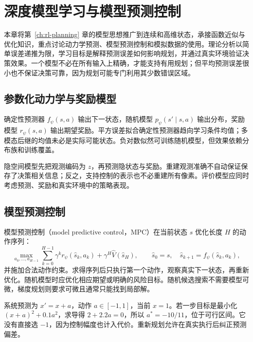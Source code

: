 \setcounter{chapter}{17} %
\chapter{深度模型学习与模型预测控制}
\label{ch:rl-deep-model}

本章将第~\ref{ch:rl-planning} 章的模型思想推广到连续和高维状态，承接函数近似与优化知识，重点讨论动力学预测、模型预测控制和模拟数据的使用。理论分析以简单误差递推为限，学习目标是解释预测误差如何影响规划，并通过真实环境验证决策效果。一个模型不必在所有输入上精确，才能支持有用规划；但平均预测误差很小也不保证决策可靠，因为规划可能专门利用其少数错误区域。

\section{参数化动力学与奖励模型}

确定性预测器 $f_\psi(s,a)$ 输出下一状态，随机模型 $p_\psi(s'\mid s,a)$ 输出分布，奖励模型 $r_\psi(s,a)$ 输出期望奖励。平方误差拟合确定性预测器趋向学习条件均值；多模态后继的均值未必是实际可能状态。负对数似然可训练随机模型，但效果依赖分布族和训练覆盖。

隐空间模型先把观测编码为 $z$，再预测隐状态与奖励。重建观测准确不自动保证保存了决策相关信息；反之，支持控制的表示也不必重建所有像素。评价模型应同时考虑预测、奖励和真实环境中的策略表现。

\section{模型预测控制}

模型预测控制（model predictive control，MPC）在当前状态 $s$ 优化长度 $H$ 的动作序列：
\[
\max_{a_0,\ldots,a_{H-1}}\sum_{k=0}^{H-1}\gamma^k r_\psi(\widehat s_k,a_k)
+\gamma^H\widehat V(\widehat s_H),\qquad
\widehat s_0=s,\quad\widehat s_{k+1}=f_\psi(\widehat s_k,a_k),
\]
并施加合法动作约束。求得序列后只执行第一个动作，观察真实下一状态，再重新优化。随机模型时应优化相应期望或明确的风险目标。随机候选搜索不需要模型可微，梯度规划则要求可微且通常只能找到局部解。

\begin{example}[一步规划的权衡]
系统预测为 $x'=x+a$，动作 $a\in[-1,1]$，当前 $x=1$。若一步目标是最小化 $(x+a)^2+0.1a^2$，求导得 $2+2.2a=0$，所以 $a^*=-10/11$，位于可行区间。它没有直接选 $-1$，因为控制幅度也计入代价。重新规划允许在真实执行后纠正预测偏差。
\end{example}

